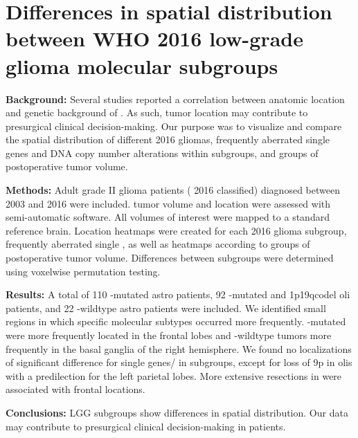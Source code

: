 
\chapter[Differences in spatial distribution between WHO 2016 low-grade glioma molecular subgroups][Spatial distribution of WHO 2016 glioma subgroups]{Differences in spatial distribution between WHO 2016 low-grade glioma molecular subgroups}\label{chap:LGGLocation}

\begin{ChapterAbstract}
    \textbf{Background:} Several studies reported a correlation between anatomic location and genetic background of .
    As such, \gls{tumor} location may contribute to presurgical clinical decision-making.
    Our purpose was to visualize and compare the spatial distribution of different  2016 gliomas, frequently aberrated single genes and DNA copy number alterations within subgroups, and groups of postoperative \gls{tumor} volume.

    \textbf{Methods:}
    Adult grade II glioma patients ( 2016 classified) diagnosed between 2003 and 2016 were included.
    \Gls{tumor} volume and location were assessed with semi-automatic software.
    All volumes of interest were mapped to a standard reference brain.
    Location heatmaps were created for each  2016 glioma subgroup, frequently aberrated single , as well as heatmaps according to groups of postoperative \gls{tumor} volume.
    Differences between subgroups were determined using voxelwise permutation testing.

    \textbf{Results:}
    A total of 110 -mutated \gls{astro} patients, 92 -mutated and \acl{1p19qcodel} \gls{oli} patients, and 22 -wildtype \gls{astro} patients were included.
    We identified small regions in which specific molecular subtypes occurred more frequently.
    -mutated  were more frequently located in the frontal lobes and -wildtype \glspl{tumor} more frequently in the basal ganglia of the right hemisphere.
    We found no localizations of significant difference for single genes/ in subgroups, except for loss of 9p in \glspl{oli} with a predilection for the left parietal lobes.
    More extensive resections in  were associated with frontal locations.

    \textbf{Conclusions:}
     \gls{LGG} subgroups show differences in spatial distribution.
    Our data may contribute to presurgical clinical decision-making in  patients.

\end{ChapterAbstract}

